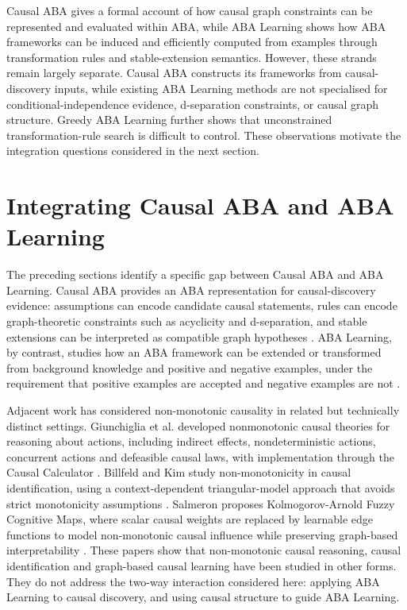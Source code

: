 Causal ABA gives a formal account of how causal graph constraints can be represented and evaluated within ABA, while ABA Learning shows how ABA frameworks can be induced and efficiently computed from examples through transformation rules and stable-extension semantics. However, these strands remain largely separate. Causal ABA constructs its frameworks from causal-discovery inputs, while existing ABA Learning methods are not specialised for conditional-independence evidence, d-separation constraints, or causal graph structure. Greedy ABA Learning further shows that unconstrained transformation-rule search is difficult to control. These observations motivate the integration questions considered in the next section.

\section{Integrating Causal ABA and ABA Learning}
The preceding sections identify a specific gap between Causal ABA and ABA Learning. Causal ABA provides an ABA representation for causal-discovery evidence: assumptions can encode candidate causal statements, rules can encode graph-theoretic constraints such as acyclicity and d-separation, and stable extensions can be interpreted as compatible graph hypotheses \cite{russo2024argumentative}. ABA Learning, by contrast, studies how an ABA framework can be extended or transformed from background knowledge and positive and negative examples, under the requirement that positive examples are accepted and negative examples are not \cite{proietti2022learning,de2023aba,de2024learning}.

Adjacent work has considered non-monotonic causality in related but technically distinct settings. Giunchiglia et al. developed nonmonotonic causal theories for reasoning about actions, including indirect effects, nondeterministic actions, concurrent actions and defeasible causal laws, with implementation through the Causal Calculator \cite{giunchiglia2004nonmonotonic}. Billfeld and Kim study non-monotonicity in causal identification, using a context-dependent triangular-model approach that avoids strict monotonicity assumptions \cite{billfeld2024context}. Salmeron proposes Kolmogorov-Arnold Fuzzy Cognitive Maps, where scalar causal weights are replaced by learnable edge functions to model non-monotonic causal influence while preserving graph-based interpretability \cite{salmeron2026non}. These papers show that non-monotonic causal reasoning, causal identification and graph-based causal learning have been studied in other forms. They do not address the two-way interaction considered here: applying ABA Learning to causal discovery, and using causal structure to guide ABA Learning.


